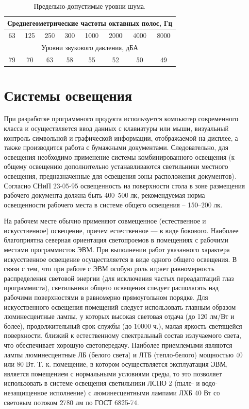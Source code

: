 \documentclass[12pt,a4paper]{report}
\begin{document}
\begin{table}[H]
\begin{center}
\begin{tabular}{|c|c|c|c|c|c|c|c|}
\hline
\multicolumn{8}{|c|}{Среднегеометрические частоты октавных полос, Гц}\\
\hline
63	&125  &250	&300  &1000  &2000  &4000  &8000\\
\hline
\multicolumn{8}{|c|}{Уровни звукового давления, дБА}\\
\hline
79  &70  &63  &58  &55  &52  &50  &49\\	
\hline
\end{tabular}
\end{center}
\caption{Предельно-допустимые уровни шума.}
\label{tb:bgd4}
\end{table}

\section{Системы освещения}

При разработке программного продукта используется компьютер современного класса и осуществляется ввод данных с клавиатуры или мыши, визуальный контроль символьной и графической информации, отображаемой на дисплее, а также производится работа с бумажными документами. Следовательно, для освещения необходимо применение системы комбинированного освещения (к общему освещению дополнительно устанавливаются светильники местного освещения, предназначенные для освещения зоны расположения документов). Согласно СНиП 23-05-95 \cite{SanPin-Light} освещенность на поверхности стола в зоне размещения рабочего документа должна быть 400–500 лк, рекомендуемая норма освещенности рабочего места в системе общего освещения -- 150–200 лк.

На рабочем месте обычно применяют совмещенное (естественное и искусственное) освещение, причем естественное — в виде бокового. Наиболее благоприятна северная ориентация светопроемов в помещениях с рабочими местами программистов ЭВМ. При выполнении работ указанного характера искусственное освещение осуществляется в виде одного общего освещения. В связи с тем, что при работе с ЭВМ особую роль играет равномерность распределения световой энергии (для исключения частых переадаптаций глаз программиста), светильники общего освещения следует располагать над рабочими поверхностями в равномерно прямоугольном порядке.
Для искусственного освещения помещений следует использовать главным образом люминесцентные лампы, у которых высокая световая отдача (до 120 лм/Вт и более), продолжительный срок службы (до 10000 ч.), малая яркость светящейся поверхности, близкий к естественному спектральный состав излучаемого света, что обеспечивает хорошую светопередачу. Наиболее приемлемыми являются лампы люминесцентные ЛБ (белого света) и ЛТБ (тепло-белого) мощностью 40 или 80 Вт. Т. к. помещение, в котором осуществляется эксплуатация ЭВМ, является помещением с нормальными условиями среды, то это позволяет использовать в системе освещения светильники ЛСПО 2 (пыле- и водо-незащищенное исполнение) с люминесцентными лампами ЛХБ 40 Вт со световым потоком 2780 лм по ГОСТ 6825-74.
\end{document}
